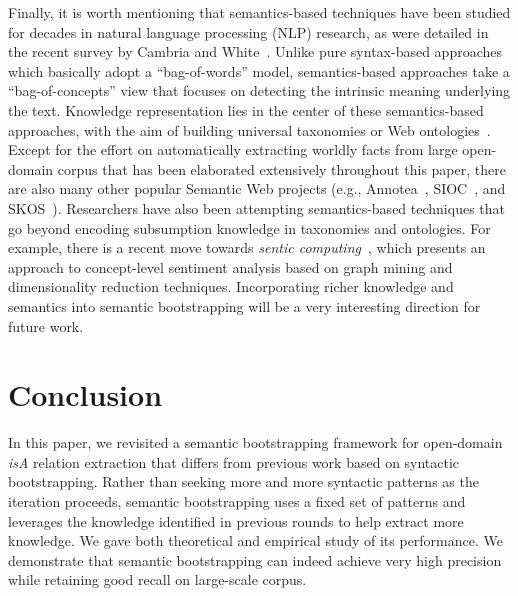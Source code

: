 \documentclass[10pt,journal,cspaper,compsoc]{IEEEtran}
\begin{document}
Finally, it is worth mentioning that semantics-based techniques have been studied for decades in natural language processing (NLP) research, as were detailed in the recent survey by Cambria and White~\cite{CambriaW14}.
Unlike pure syntax-based approaches which basically adopt a ``bag-of-words'' model, semantics-based approaches take a ``bag-of-concepts'' view that focuses on detecting the intrinsic meaning underlying the text.
Knowledge representation lies in the center of these semantics-based approaches, with the aim of building universal taxonomies or Web ontologies~\cite{CambriaW14}.
Except for the effort on automatically extracting worldly facts from large open-domain corpus that has been elaborated extensively throughout this paper, there are also many other popular Semantic Web projects (e.g., Annotea~\cite{KahanK01}, SIOC~\cite{BreslinHBD05}, and SKOS~\cite{BakerBIMSS13}).
Researchers have also been attempting semantics-based techniques that go beyond encoding subsumption knowledge in taxonomies and ontologies.
For example, there is a recent move towards \emph{sentic computing}~\cite{cambria2012sentic}, which presents an approach to concept-level sentiment analysis based on graph mining and dimensionality reduction techniques.
Incorporating richer knowledge and semantics into semantic bootstrapping will be a very interesting direction for future work.

\section{Conclusion}\label{sec:conclusion}

In this paper, we revisited a semantic bootstrapping framework for open-domain \emph{isA} relation extraction that differs from previous work based on syntactic bootstrapping. Rather than seeking more and more syntactic patterns as the iteration proceeds, semantic bootstrapping uses a fixed set of patterns and leverages the knowledge identified in previous rounds to help extract more knowledge. We gave both theoretical and empirical study of its performance. We demonstrate that semantic bootstrapping can indeed achieve very high precision while retaining good recall on large-scale corpus.


{
\renewcommand{\baselinestretch}{1.1}
\small



}
\end{document}
